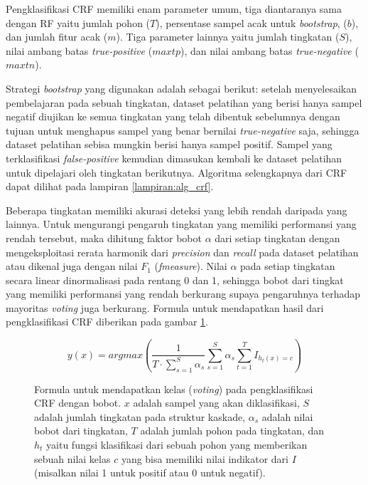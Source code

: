 Pengklasifikasi CRF memiliki enam parameter umum, tiga diantaranya sama dengan
RF yaitu jumlah pohon ($T$), persentase sampel acak untuk \textit{bootstrap},
($b$), dan jumlah fitur acak ($m$).
Tiga parameter lainnya yaitu jumlah tingkatan ($S$), nilai ambang batas
\textit{true-positive} ($maxtp$), dan nilai ambang batas
\textit{true-negative} ($maxtn$).

Strategi \textit{bootstrap} yang digunakan adalah sebagai berikut: setelah
menyelesaikan pembelajaran pada sebuah tingkatan, dataset pelatihan yang berisi
hanya sampel negatif diujikan ke semua tingkatan yang telah dibentuk
sebelumnya dengan tujuan untuk menghapus sampel yang benar bernilai
\textit{true-negative} saja, sehingga dataset pelatihan sebisa mungkin berisi
hanya sampel positif.
Sampel yang terklasifikasi \textit{false-positive} kemudian dimasukan kembali
ke dataset pelatihan untuk dipelajari oleh tingkatan berikutnya.
Algoritma selengkapnya dari CRF dapat dilihat pada lampiran
\ref{lampiran:alg_crf}.

Beberapa tingkatan memiliki akurasi deteksi yang lebih rendah daripada
yang lainnya.
Untuk mengurangi pengaruh tingkatan yang memiliki performansi yang rendah
tersebut, maka dihitung faktor bobot $\alpha$ dari setiap tingkatan dengan
mengeksploitasi rerata harmonik dari \textit{precision} dan \textit{recall}
pada dataset pelatihan atau dikenal juga dengan nilai $F_1$
(\textit{fmeasure}).
Nilai $\alpha$ pada setiap tingkatan secara linear dinormalisasi pada rentang 0
dan 1, sehingga bobot dari tingkat yang memiliki performansi yang rendah
berkurang supaya pengaruhnya terhadap mayoritas \textit{voting} juga berkurang.
Formula untuk mendapatkan hasil dari pengklasifikasi CRF diberikan pada gambar
\ref{form:crf}.

\begin{figure}[h]
\[
	y(x) = argmax \left(
			\frac{1}{T \cdot \sum^{S}_{s=1} \alpha_{s} }
			\sum\limits_{s=1}^{S} \alpha_{s}
			\sum\limits^{T}_{t=1} I_{h_{t} (x) = c}
		\right)
\]
\caption{
Formula untuk mendapatkan kelas (\textit{voting}) pada pengklasifikasi CRF
dengan bobot.
$x$ adalah sampel yang akan diklasifikasi,
$S$ adalah jumlah tingkatan pada struktur kaskade,
$\alpha_{s}$ adalah nilai bobot dari tingkatan,
$T$ adalah jumlah pohon pada tingkatan, dan
$h_{t}$ yaitu fungsi klasifikasi dari sebuah pohon yang memberikan sebuah nilai
kelas $c$ yang bisa memiliki nilai indikator dari $I$
(misalkan nilai 1 untuk positif atau 0 untuk negatif).
}
\label{form:crf}
\end{figure}
